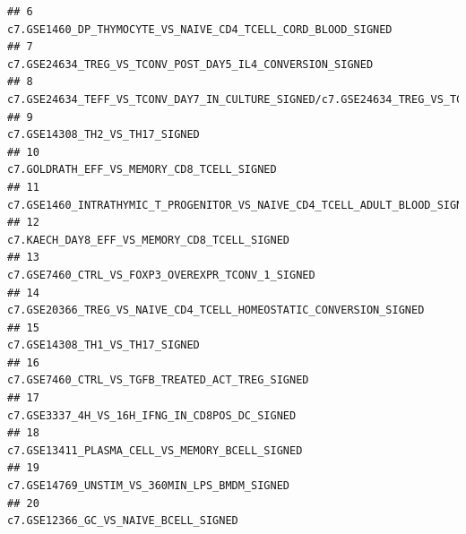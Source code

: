 \documentclass{article}\usepackage[]{graphicx}\usepackage[]{color}
\makeatletter
\newenvironment{kframe}{%
 \def\at@end@of@kframe{}%
 \ifinner\ifhmode%
  \def\at@end@of@kframe{\end{minipage}}%
  \begin{minipage}{\columnwidth}%
 \fi\fi%
 \def\FrameCommand##1{\hskip\@totalleftmargin \hskip-\fboxsep
 \colorbox{shadecolor}{##1}\hskip-\fboxsep
     \hskip-\linewidth \hskip-\@totalleftmargin \hskip\columnwidth}%
 \MakeFramed {\advance\hsize-\width
   \@totalleftmargin\z@ \linewidth\hsize
   \@setminipage}}%
 {\par\unskip\endMakeFramed%
 \at@end@of@kframe}
\newenvironment{knitrout}{}{} %
\makeatother
\begin{document}
\begin{knitrout}
\begin{kframe}
\begin{verbatim}
## 6                                                                                                                        c7.GSE1460_DP_THYMOCYTE_VS_NAIVE_CD4_TCELL_CORD_BLOOD_SIGNED
## 7                                                                                                                           c7.GSE24634_TREG_VS_TCONV_POST_DAY5_IL4_CONVERSION_SIGNED
## 8                                                                          c7.GSE24634_TEFF_VS_TCONV_DAY7_IN_CULTURE_SIGNED/c7.GSE24634_TREG_VS_TCONV_POST_DAY7_IL4_CONVERSION_SIGNED
## 9                                                                                                                                                      c7.GSE14308_TH2_VS_TH17_SIGNED
## 10                                                                                                                                         c7.GOLDRATH_EFF_VS_MEMORY_CD8_TCELL_SIGNED
## 11                                                                                                          c7.GSE1460_INTRATHYMIC_T_PROGENITOR_VS_NAIVE_CD4_TCELL_ADULT_BLOOD_SIGNED
## 12                                                                                                                                       c7.KAECH_DAY8_EFF_VS_MEMORY_CD8_TCELL_SIGNED
## 13                                                                                                                                   c7.GSE7460_CTRL_VS_FOXP3_OVEREXPR_TCONV_1_SIGNED
## 14                                                                                                                  c7.GSE20366_TREG_VS_NAIVE_CD4_TCELL_HOMEOSTATIC_CONVERSION_SIGNED
## 15                                                                                                                                                     c7.GSE14308_TH1_VS_TH17_SIGNED
## 16                                                                                                                                    c7.GSE7460_CTRL_VS_TGFB_TREATED_ACT_TREG_SIGNED
## 17                                                                                                                                      c7.GSE3337_4H_VS_16H_IFNG_IN_CD8POS_DC_SIGNED
## 18                                                                                                                                     c7.GSE13411_PLASMA_CELL_VS_MEMORY_BCELL_SIGNED
## 19                                                                                                                                       c7.GSE14769_UNSTIM_VS_360MIN_LPS_BMDM_SIGNED
## 20                                                                                                                                               c7.GSE12366_GC_VS_NAIVE_BCELL_SIGNED

\end{verbatim}
\end{kframe}
\end{knitrout}
\end{document}
